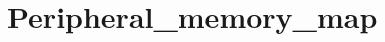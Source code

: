 \hypertarget{group___peripheral__memory__map}{\section{Peripheral\-\_\-memory\-\_\-map}
\label{group___peripheral__memory__map}
}
